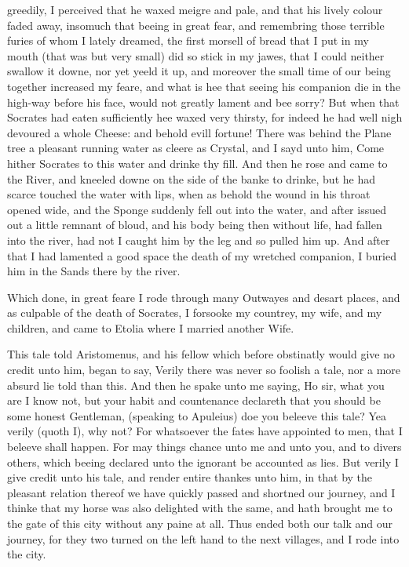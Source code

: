 greedily, I perceived that he waxed meigre and pale, and that his lively colour
faded away, insomuch that beeing in great fear, and remembring those terrible
furies of whom I lately dreamed, the first morsell of bread that I put in my
mouth (that was but very small) did so stick in my jawes, that I could neither
swallow it downe, nor yet yeeld it up, and moreover the small time of our being
together increased my feare, and what is hee that seeing his companion die in
the high-way before his face, would not greatly lament and bee sorry? But when
that Socrates had eaten sufficiently hee waxed very thirsty, for indeed he had
well nigh devoured a whole Cheese: and behold evill fortune! There was behind
the Plane tree a pleasant running water as cleere as Crystal, and I sayd unto
him, Come hither Socrates to this water and drinke thy fill. And then he rose
and came to the River, and kneeled downe on the side of the banke to drinke,
but he had scarce touched the water with lips, when as behold the wound in his
throat opened wide, and the Sponge suddenly fell out into the water, and after
issued out a little remnant of bloud, and his body being then without life, had
fallen into the river, had not I caught him by the leg and so pulled him up.
And after that I had lamented a good space the death of my wretched companion,
I buried him in the Sands there by the river.

Which done, in great feare I rode through many Outwayes and desart places, and
as culpable of the death of Socrates, I forsooke my countrey, my wife, and my
children, and came to Etolia where I married another Wife.

This tale told Aristomenus, and his fellow which before obstinatly would give
no credit unto him, began to say, Verily there was never so foolish a tale, nor
a more absurd lie told than this. And then he spake unto me saying, Ho sir,
what you are I know not, but your habit and countenance declareth that you
should be some honest Gentleman, (speaking to Apuleius) doe you beleeve this
tale? Yea verily (quoth I), why not? For whatsoever the fates have appointed to
men, that I beleeve shall happen. For may things chance unto me and unto you,
and to divers others, which beeing declared unto the ignorant be accounted as
lies. But verily I give credit unto his tale, and render entire thankes unto
him, in that by the pleasant relation thereof we have quickly passed and
shortned our journey, and I thinke that my horse was also delighted with the
same, and hath brought me to the gate of this city without any paine at all.
Thus ended both our talk and our journey, for they two turned on the left hand
to the next villages, and I rode into the city.

